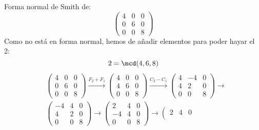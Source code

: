 \begin{ejemplo}
    Forma normal de Smith de:
    \begin{equation*}
        \left(\begin{array}{ccc}
            4 & 0 & 0 \\
            0 & 6 & 0 \\
            0 & 0 & 8
        \end{array}\right)
    \end{equation*}
    Como no está en forma normal, hemos de añadir elementos para poder hayar el 2:
    \begin{equation*}
        2 = \mcd(4,6,8)
    \end{equation*}
    \begin{align*}
        &\left(\begin{array}{ccc}
            4 & 0 & 0 \\
            0 & 6 & 0 \\
            0 & 0 & 8
        \end{array}\right)
        \stackrel{F_2 + F_1}{\longrightarrow}
        \left(\begin{array}{ccc}
            4 & 0 & 0 \\
            4 & 6 & 0 \\
            0 & 0 & 8
        \end{array}\right)
        \stackrel{C_2 - C_1}{\longrightarrow}
        \left(\begin{array}{ccc}
            4 & -4 & 0 \\
            4 & 2 & 0 \\
            0 & 0 & 8
        \end{array}\right)
        \stackrel{}{\longrightarrow} \\
        &\left(\begin{array}{ccc}
            -4 & 4 & 0 \\
            4 & 2 & 0 \\
            0 & 0 & 8
        \end{array}\right)
        \stackrel{}{\longrightarrow} 
        \left(\begin{array}{ccc}
            2 & 4 & 0 \\
            -4 & 4 & 0 \\
            0 & 0 & 8
        \end{array}\right)
        \stackrel{}{\longrightarrow} 
        \left(\begin{array}{ccc}
            2 & 4 & 0 \\

\end{array}
\end{align*}
\end{ejemplo}
